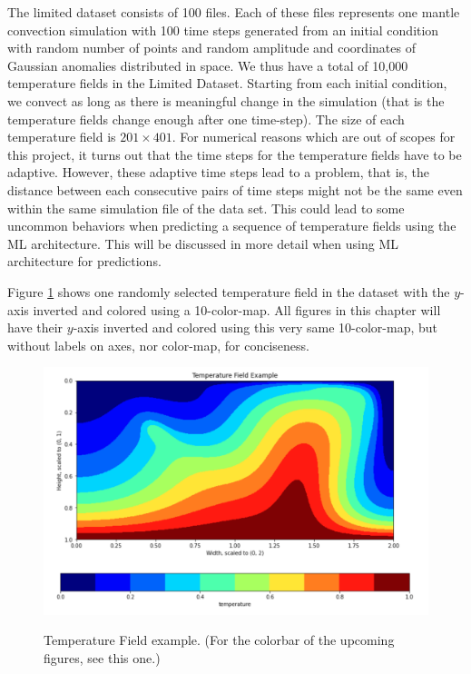 The limited dataset consists of 100 files. Each of these files represents one mantle convection simulation with 100 time steps generated from an initial condition with random number of points and random amplitude and coordinates of Gaussian anomalies distributed in space. We thus have a total of 10,000 temperature fields in the Limited Dataset. Starting from each initial condition, we convect as long as there is meaningful change in the simulation (that is the temperature fields change enough after one time-step). The size of each temperature field is $201 \times 401$. For numerical reasons which are out of scopes for this project, it turns out that the time steps for the temperature fields have to be adaptive. However, these adaptive time steps lead to a problem, that is, the distance between each consecutive pairs of time steps might not be the same even within the same simulation file of the data set. This could lead to some uncommon behaviors when predicting a sequence of temperature fields using the ML architecture. This will be discussed in more detail when using ML architecture for predictions.

Figure \ref{figure:temperature_field_sample} shows one randomly selected temperature field in the dataset with the $y$-axis inverted and colored using a 10-color-map. All figures in this chapter will have their $y$-axis inverted and colored using this very same 10-color-map, but without labels on axes, nor color-map, for conciseness.

\begin{figure}[H]
    \caption{Temperature Field example. (For the colorbar of the upcoming figures, see this one.)}
    \includegraphics[scale=0.6]{figures/mantle_convection_images/temperature_field_example.png}
    \label{figure:temperature_field_sample}
\end{figure}

